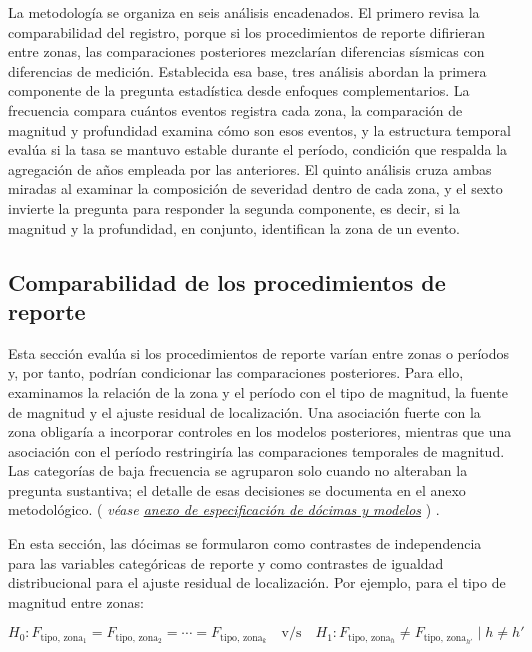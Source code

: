 \documentclass[
  spanish,
  letterpaper,
  DIV=11,
  numbers=noendperiod]{scrartcl}
\newcommand{\asesoriaParenRef}[1]{%
  \textnormal{\textcolor{asesoriaTextColor}{(}}%
  {\hypersetup{linkcolor=asesoriaLinkColor,urlcolor=asesoriaLinkColor,citecolor=asesoriaLinkColor}\textcolor{asesoriaTextColor}{\emph{#1}}}%
  \textnormal{\textcolor{asesoriaTextColor}{)}}%
}
\begin{document}
La metodología se organiza en seis análisis encadenados. El primero
revisa la comparabilidad del registro, porque si los procedimientos de
reporte difirieran entre zonas, las comparaciones posteriores mezclarían
diferencias sísmicas con diferencias de medición. Establecida esa base,
tres análisis abordan la primera componente de la pregunta estadística
desde enfoques complementarios. La frecuencia compara cuántos eventos
registra cada zona, la comparación de magnitud y profundidad examina
cómo son esos eventos, y la estructura temporal evalúa si la tasa se
mantuvo estable durante el período, condición que respalda la agregación
de años empleada por las anteriores. El quinto análisis cruza ambas
miradas al examinar la composición de severidad dentro de cada zona, y
el sexto invierte la pregunta para responder la segunda componente, es
decir, si la magnitud y la profundidad, en conjunto, identifican la zona
de un evento.

\subsection{Comparabilidad de los procedimientos de
reporte}\label{sec-met-comparabilidad}

Esta sección evalúa si los procedimientos de reporte varían entre zonas
o períodos y, por tanto, podrían condicionar las comparaciones
posteriores. Para ello, examinamos la relación de la zona y el período
con el tipo de magnitud, la fuente de magnitud y el ajuste residual de
localización. Una asociación fuerte con la zona obligaría a incorporar
controles en los modelos posteriores, mientras que una asociación con el
período restringiría las comparaciones temporales de magnitud. Las
categorías de baja frecuencia se agruparon solo cuando no alteraban la
pregunta sustantiva; el detalle de esas decisiones se documenta en el
anexo metodológico.
\asesoriaParenRef{véase \hyperref[sec-anexo-especificacion]{anexo de especificación de dócimas y modelos}}.

En esta sección, las dócimas se formularon como contrastes de
independencia para las variables categóricas de reporte y como
contrastes de igualdad distribucional para el ajuste residual de
localización. Por ejemplo, para el tipo de magnitud entre zonas:

\begingroup
\setlength{\abovedisplayskip}{0pt}
\setlength{\belowdisplayskip}{0pt}
\setlength{\abovedisplayshortskip}{0pt}
\setlength{\belowdisplayshortskip}{0pt}
\vspace{-1.10em}
\[
H_0: F_{\text{tipo},\,\text{zona}_1}=F_{\text{tipo},\,\text{zona}_2}=\cdots=F_{\text{tipo},\,\text{zona}_k}
\quad \text{v/s} \quad
H_1: F_{\text{tipo},\,\text{zona}_h}\neq F_{\text{tipo},\,\text{zona}_{h'}} \mid h \neq h'
\]
\vspace{-1.15em}
\endgroup
\end{document}

